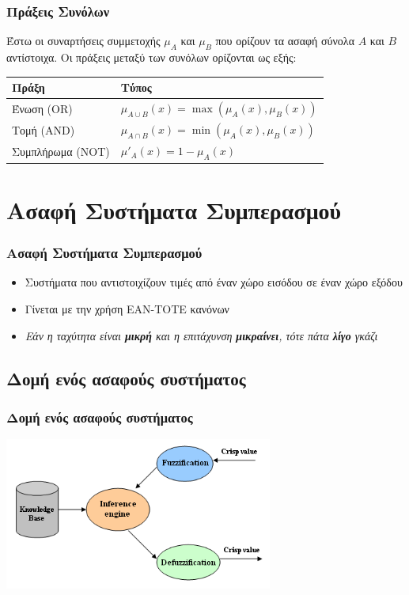 \documentclass[xetex,serif,mathserif,14pt]{beamer}
\begin{document}
\begin{frame}
\frametitle{Πράξεις Συνόλων}
Έστω οι συναρτήσεις συμμετοχής $\mu_A$ και $\mu_B$ που ορίζουν τα ασαφή σύνολα $A$ και $B$ αντίστοιχα. Οι πράξεις μεταξύ των συνόλων ορίζονται ως εξής:
\begin{table}[h]
\begin{small}
\begin{tabular}{@{}ll@{}}
    \toprule
    Πράξη             & Τύπος\\ \midrule
    Ένωση (OR)        & $\mu_{A \cup B}\left(x\right) = \max\left(\mu_{A}\left(x\right), \mu_{B}\left(x\right)\right)$ \\
    Τομή (AND)        & $\mu_{A \cap B}\left(x\right) = \min\left(\mu_{A}\left(x\right), \mu_{B}\left(x\right)\right)$ \\
    Συμπλήρωμα (NOT)  & $\mu'_{A}\left(x\right) = 1 - \mu_{A}\left(x\right)$ \\ \bottomrule
\end{tabular}
\end{small}
\end{table}
\end{frame}


\section{Ασαφή Συστήματα Συμπερασμού}

\begin{frame}
\frametitle{Ασαφή Συστήματα Συμπερασμού}
\begin{itemize}
  \item Συστήματα που αντιστοιχίζουν τιμές από έναν χώρο εισόδου σε έναν χώρο εξόδου\pause
  \item Γίνεται με την χρήση ΕΑΝ-ΤΟΤΕ κανόνων\pause
  \item \textit{Εάν η ταχύτητα είναι \textbf{μικρή} και η επιτάχυνση \textbf{μικραίνει}, τότε πάτα \textbf{λίγο} γκάζι}
\end{itemize}
\end{frame}

\subsection{Δομή ενός ασαφούς συστήματος}

\begin{frame}
\frametitle{Δομή ενός ασαφούς συστήματος}
\centering
\includegraphics[height=5cm]{images/modulosfis_en.png}
\end{frame}
\end{document}
